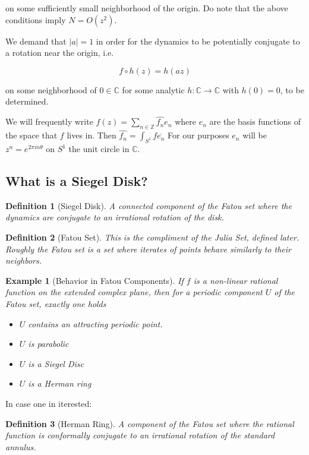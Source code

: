 \documentclass{article}
\newcommand{\C}{\mathbb{C}}
\newcommand{\Z}{\mathbb{Z}}
\theoremstyle{plain}
\newtheorem*{dfn}{Definition}
\newtheorem*{ex}{Example}
\theoremstyle{remark}
\begin{document}
on some sufficiently small neighborhood of the origin. 
Do note that the above conditions imply $N = O(z^2)$. 

We demand that $|a| = 1$ in order for the dynamics to be potentially conjugate to a rotation near the origin, i.e. 

\[
f \circ h(z) = h(az)
\]

on some neighborhood of $0 \in \C$ for some analytic $h : \C \to \C$ with $h(0) = 0$, to be determined.

We will frequently write $f(z) = \sum_{n \in \Z} \hat{f_n} e_n$ where $e_n$ are the basis functions of the space that $f$ lives in. 
Then $\hat{f_n} = \int_{S^1} f \overline{e_n}$
For our purposes $e_n$ will be $z^n = e^{2\pi i n \theta}$ on $S^1$ the unit circle in $\C$. 

\subsection{What is a Siegel Disk?}
\begin{dfn}[Siegel Disk]
A connected component of the Fatou set where the dynamics are conjugate to an irrational rotation of the disk. 
\end{dfn}

\begin{dfn}[Fatou Set]
This is the compliment of the Julia Set, defined later. 
Roughly the Fatou set is a set where iterates of points behave similarly to their neighbors. 
\end{dfn}

\begin{ex}[Behavior in Fatou Components]
If $f$ is a non-linear rational function on the extended complex plane, then for a periodic component $U$ of the Fatou set, exactly one holds
\begin{itemize}[noitemsep, topsep=0pt]
\item $U$ contains an attracting periodic point.
\item $U$ is parabolic
\item $U$ is a Siegel Disc
\item $U$ is a Herman ring
\end{itemize}
\end{ex}

In case one in iterested:
\begin{dfn}[Herman Ring]
A component of the Fatou set where the rational function is conformally conjugate to an irrational rotation of the standard annulus. 
\end{dfn}
\end{document}
